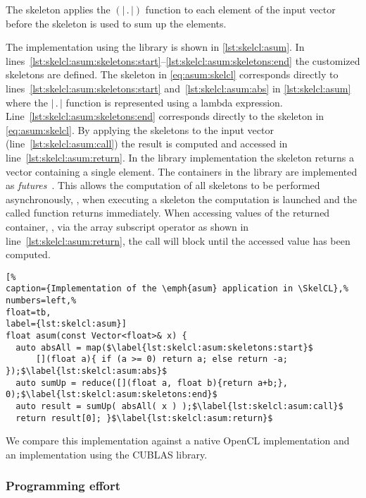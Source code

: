The \map skeleton applies the $(|\, .\, |)$ function to each element of the input vector before the \reduce skeleton is used to sum up the elements.

The implementation using the \SkelCL library is shown in \autoref{lst:skelcl:asum}.
In lines~\ref{lst:skelcl:asum:skeletons:start}--\ref{lst:skelcl:asum:skeletons:end} the customized skeletons are defined.
The \map skeleton in \autoref{eq:asum:skelcl} corresponds directly to lines~\ref{lst:skelcl:asum:skeletons:start} and~\ref{lst:skelcl:asum:abs} in \autoref{lst:skelcl:asum} where the $|\, .\, |$ function is represented using a \Cpp lambda expression.
Line~\ref{lst:skelcl:asum:skeletons:end} corresponds directly to the \reduce skeleton in \autoref{eq:asum:skelcl}.
By applying the skeletons to the input vector (line~\ref{lst:skelcl:asum:call}) the result is computed and accessed in line~\ref{lst:skelcl:asum:return}.
In the \SkelCL library implementation the \reduce skeleton returns a vector containing a single element.
The containers in the \SkelCL library are implemented as \emph{futures}~\cite{HewittBa1977,FriedmanWi1978}.
This allows the computation of all skeletons to be performed asynchronously, \ie, when executing a skeleton the computation is launched and the called function returns immediately.
When accessing values of the returned container, \eg, via the array subscript operator as shown in line~\ref{lst:skelcl:asum:return}, the call will block until the accessed value has been computed.

\begin{lstlisting}[%                                                             
caption={Implementation of the \emph{asum} application in \SkelCL},%
numbers=left,%
float=tb,
label={lst:skelcl:asum}]
float asum(const Vector<float>& x) {
  auto absAll = map($\label{lst:skelcl:asum:skeletons:start}$
      [](float a){ if (a >= 0) return a; else return -a; });$\label{lst:skelcl:asum:abs}$
  auto sumUp = reduce([](float a, float b){return a+b;}, 0);$\label{lst:skelcl:asum:skeletons:end}$
  auto result = sumUp( absAll( x ) );$\label{lst:skelcl:asum:call}$
  return result[0]; }$\label{lst:skelcl:asum:return}$
\end{lstlisting}

We compare this implementation against a native OpenCL implementation and an implementation using the CUBLAS library.

\subsubsection*{Programming effort}

